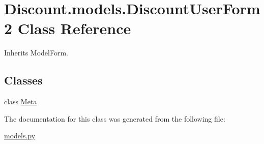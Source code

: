 \hypertarget{class_discount_1_1models_1_1_discount_user_form2}{}\section{Discount.\+models.\+Discount\+User\+Form2 Class Reference}
\label{class_discount_1_1models_1_1_discount_user_form2}


Inherits Model\+Form.

\subsection*{Classes}
\begin{DoxyCompactItemize}
\item 
class \hyperlink{class_discount_1_1models_1_1_discount_user_form2_1_1_meta}{Meta}
\end{DoxyCompactItemize}


The documentation for this class was generated from the following file\+:\begin{DoxyCompactItemize}
\item 
\hyperlink{models_8py}{models.\+py}\end{DoxyCompactItemize}
